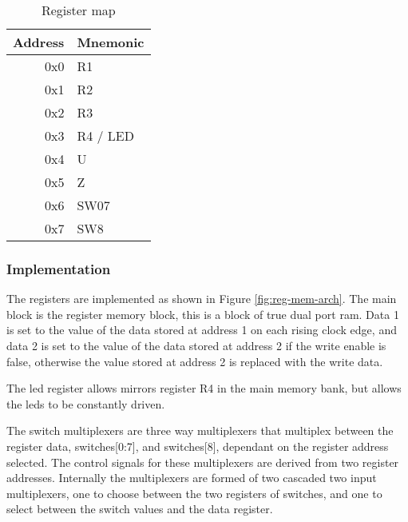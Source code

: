 \begin{table}[ht]
	\centering
	\caption{Register map}
	\label{tbl:reg-map}
	\begin{tabular}{r | l}
		\toprule
		Address & Mnemonic \\
		\midrule
		0x0	& R1 \\
		0x1	& R2 \\
		0x2	& R3 \\
		0x3	& R4 / LED \\
		0x4	& U \\
		0x5	& Z \\
		0x6	& SW07 \\
		0x7	& SW8 \\
		\bottomrule
	\end{tabular}
\end{table}

\subsubsection{Implementation}
The registers are implemented as shown in Figure \ref{fig:reg-mem-arch}. The main block is the register memory block, this is a block of true dual port \gls{ram}. Data 1 is set to the value of the data stored at address 1 on each rising clock edge, and data 2 is set to the value of the data stored at address 2 if the write enable is false, otherwise the value stored at address 2 is replaced with the write data.

The \gls{led} register allows mirrors register R4 in the main memory bank, but allows the \glspl{led} to be constantly driven.

The switch multiplexers are three way multiplexers that multiplex between the register data, switches[0:7], and switches[8], dependant on the register address selected. The control signals for these multiplexers are derived from two register addresses. Internally the multiplexers are formed of two cascaded two input multiplexers, one to choose between the two registers of switches, and one to select between the switch values and the data register.

